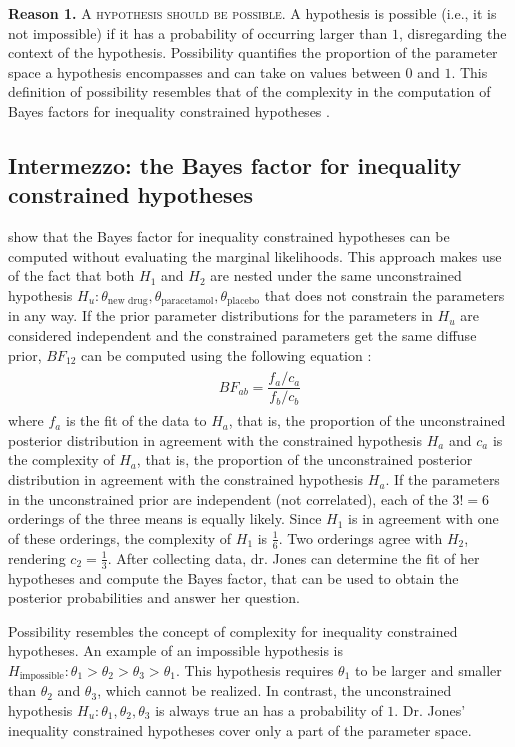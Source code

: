\documentclass[man]{apa6}
\begin{document}
\noindent\textbf{Reason 1.} 
\textsc{A hypothesis should be possible.}
A hypothesis is possible (i.e., it is not impossible) if it has a probability of occurring larger than $1$, disregarding the context of the hypothesis.
Possibility quantifies the proportion of the parameter space a hypothesis encompasses and can take on values between $0$ and $1$.
This definition of possibility resembles that of the complexity in the computation of Bayes factors for inequality constrained hypotheses \cite{klugkist05}.

\subsection{Intermezzo: the Bayes factor for inequality constrained hypotheses}
 show that the Bayes factor for inequality constrained hypotheses can be computed without evaluating the marginal likelihoods.
This approach makes use of the fact that both $H_1$ and $H_2$ are nested under the same unconstrained hypothesis $H_u: \theta_{\text{new drug}}, \theta_{\text{paracetamol}}, \theta_{\text{placebo}}$ that does not constrain the parameters in any way.
If the prior parameter distributions for the parameters in $H_u$ are considered independent and the constrained parameters get the same diffuse prior, $BF_{12}$ can be computed using the following equation \cite{klugkist05}:
\begin{align}
\label{eq:complexityfit}
\begin{split}
BF_{ab} = \dfrac{f_a/c_a}{f_b/c_b}
\end{split}
\end{align}
where $f_a$ is the fit of the data to $H_a$, that is, the proportion of the unconstrained posterior distribution in agreement with the constrained hypothesis $H_a$ and $c_a$ is the complexity of $H_a$, that is, the proportion of the unconstrained posterior distribution in agreement with the constrained hypothesis $H_a$.
If the parameters in the unconstrained prior are independent (not correlated), each of the $3!=6$ orderings of the three means is equally likely. 
Since $H_1$ is in agreement with one of these orderings, the complexity of $H_1$ is $\frac{1}{6}$.
Two orderings agree with $H_2$, rendering $c_2 = \frac{1}{3}$.
After collecting data, dr. Jones can determine the fit of her hypotheses and compute the Bayes factor, that can be used to obtain the posterior probabilities and answer her question.

Possibility resembles the concept of complexity for inequality constrained hypotheses.
An example of an impossible hypothesis is $H_{\text{impossible}}: \theta_1 > \theta_2 > \theta_3 > \theta_1$. 
This hypothesis requires $\theta_1$ to be larger and smaller than $\theta_2$ and $\theta_3$, which cannot be realized.
In contrast, the unconstrained hypothesis $H_u: \theta_1, \theta_2, \theta_3$ is always true an has a probability of $1$.
Dr. Jones' inequality constrained hypotheses cover only a part of the parameter space.
\end{document}
